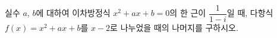 실수 $a$, $b$에 대하여 이차방정식 $x^2+ax+b=0$의 한 근이 $\dfrac{1}{1-i}$일 때, 다항식 $f(x)=x^2+ax+b$를 $x-2$로 나누었을 때의 나머지를 구하시오.
